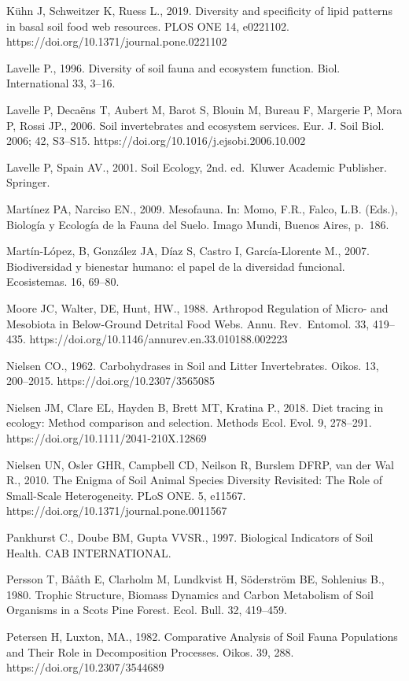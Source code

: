 \documentclass[10pt,oneside]{article}
\begin{document}
Kühn J, Schweitzer K, Ruess L., 2019. Diversity and specificity of lipid
patterns in basal soil food web resources. PLOS ONE 14, e0221102.
https://doi.org/10.1371/journal.pone.0221102

Lavelle P., 1996. Diversity of soil fauna and ecosystem function. Biol.
International 33, 3--16.

Lavelle P, Decaëns T, Aubert M, Barot S, Blouin M, Bureau F, Margerie P,
Mora P, Rossi JP., 2006. Soil invertebrates and ecosystem services. Eur.
J. Soil Biol. 2006; 42, S3--S15.
https://doi.org/10.1016/j.ejsobi.2006.10.002

Lavelle P, Spain AV., 2001. Soil Ecology, 2nd. ed.~Kluwer Academic
Publisher. Springer.

Martínez PA, Narciso EN., 2009. Mesofauna. In: Momo, F.R., Falco, L.B.
(Eds.), Biología y Ecología de la Fauna del Suelo. Imago Mundi, Buenos
Aires, p.~186.

Martín-López, B, González JA, Díaz S, Castro I, García-Llorente M.,
2007. Biodiversidad y bienestar humano: el papel de la diversidad
funcional. Ecosistemas. 16, 69--80.

Moore JC, Walter, DE, Hunt, HW., 1988. Arthropod Regulation of Micro-
and Mesobiota in Below-Ground Detrital Food Webs. Annu. Rev.~Entomol.
33, 419--435. https://doi.org/10.1146/annurev.en.33.010188.002223

Nielsen CO., 1962. Carbohydrases in Soil and Litter Invertebrates.
Oikos. 13, 200--2015. https://doi.org/10.2307/3565085

Nielsen JM, Clare EL, Hayden B, Brett MT, Kratina P., 2018. Diet tracing
in ecology: Method comparison and selection. Methods Ecol. Evol. 9,
278--291. https://doi.org/10.1111/2041-210X.12869

Nielsen UN, Osler GHR, Campbell CD, Neilson R, Burslem DFRP, van der Wal
R., 2010. The Enigma of Soil Animal Species Diversity Revisited: The
Role of Small-Scale Heterogeneity. PLoS ONE. 5, e11567.
https://doi.org/10.1371/journal.pone.0011567

Pankhurst C., Doube BM, Gupta VVSR., 1997. Biological Indicators of Soil
Health. CAB INTERNATIONAL.

Persson T, Bååth E, Clarholm M, Lundkvist H, Söderström BE, Sohlenius
B., 1980. Trophic Structure, Biomass Dynamics and Carbon Metabolism of
Soil Organisms in a Scots Pine Forest. Ecol. Bull. 32, 419--459.

Petersen H, Luxton, MA., 1982. Comparative Analysis of Soil Fauna
Populations and Their Role in Decomposition Processes. Oikos. 39, 288.
https://doi.org/10.2307/3544689
\end{document}
